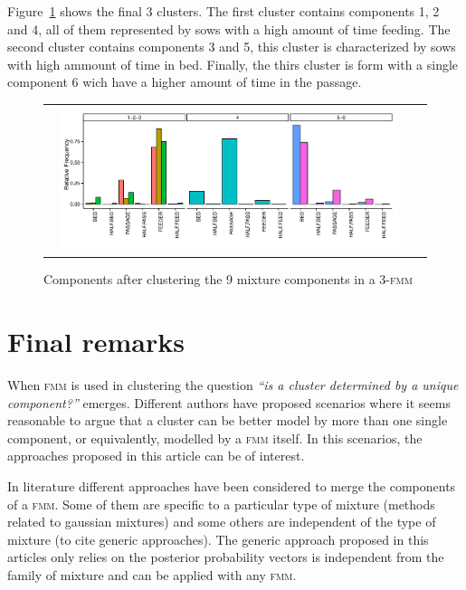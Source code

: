 \documentclass[submit]{smj}
\theoremstyle{definition}
\newcommand{\fmm}{\textsc{fmm}\xspace}
\begin{document}
Figure~\ref{multinomial_clust3} shows the final 3 clusters. The first cluster contains components 1, 2 and 4, all of them represented by sows with a high amount of time feeding. The second cluster contains components 3 and 5, this cluster is characterized by sows with high ammount of time in bed. Finally, the thirs cluster is form with a single component 6 wich have a higher amount of time in the passage.

\begin{figure}[t]
\begin{center}
\begin{tabular}{cc}
  \includegraphics[width=0.95\textwidth]{figures/multinomial_clust3_all.pdf} \\
 \end{tabular}
 \caption{Components after clustering the 9 mixture components in a 3-\fmm}\label{multinomial_clust3}
\end{center}
\end{figure}

\section{Final remarks}\label{remarks}

When \fmm is used in clustering the question \textit{``is a cluster determined by a unique component?''} emerges. Different authors have proposed scenarios where it seems reasonable to argue that a cluster can be better model by more than one single component, or equivalently, modelled by a \fmm itself. In this scenarios, the approaches proposed in this article can be of interest.

In literature different approaches have been considered to merge the components of a \fmm. Some of them are specific to a particular type of mixture (methods related to gaussian mixtures) and some others are independent of the type of mixture (to cite generic approaches). The generic approach proposed in this articles only relies  on the posterior probability vectors is independent from the family of mixture and can be applied with any \fmm.
\end{document}
